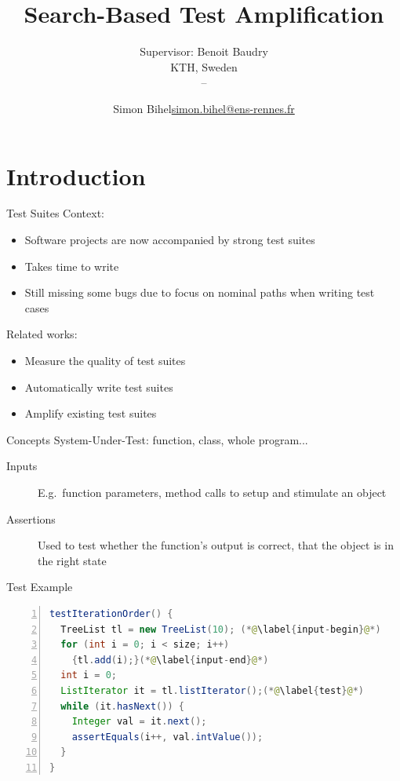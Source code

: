 \documentclass{beamer}
\title{Search-Based Test Amplification}
\subtitle{Supervisor: Benoit Baudry\\KTH, Sweden\\\displaydate{startdate} -- \displaydate{enddate}}
\date{\displaydate{defensedate}}
\author{%
  Simon Bihel\hfill\url{simon.bihel@ens-rennes.fr} \\
}
\institute{%
  University of Rennes I \\
  \'Ecole Normale Sup\'erieure de Rennes
}
\begin{document}
\maketitle



\section{Introduction}

\begin{frame}{Test Suites}
  Context:
  \begin{itemize}
    \item Software projects are now accompanied by strong test suites
    \item Takes time to write
    \item Still missing some bugs due to focus on nominal paths when writing test cases
  \end{itemize}

  \pause{}

  Related works:
  \begin{itemize}
    \item Measure the quality of test suites
    \item Automatically write test suites
    \item \alert{Amplify} existing test suites
  \end{itemize}
\end{frame}

\begin{frame}{Concepts}
  System-Under-Test: function, class, whole program...
  \begin{description}
    \item[Inputs] E.g.\ function parameters, method calls to setup and stimulate an object
    \item[Assertions] Used to test whether the function's output is correct, that the object is in the right state
  \end{description}
\end{frame}
\begin{frame}[fragile]{Test Example}
\begin{lstlisting}[language=java,numbers=left]
testIterationOrder() {
  TreeList tl = new TreeList(10); (*@\label{input-begin}@*)
  for (int i = 0; i < size; i++)
    {tl.add(i);}(*@\label{input-end}@*)
  int i = 0;
  ListIterator it = tl.listIterator();(*@\label{test}@*)
  while (it.hasNext()) {
    Integer val = it.next();
    assertEquals(i++, val.intValue());
  }
}
\end{lstlisting}
\end{frame}
\end{document}
